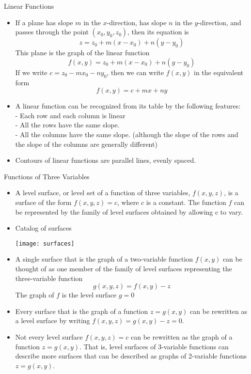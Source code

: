 \documentclass[12pt,letterpaper, onecolumn]{exam}
\begin{document}
		 Linear Functions
		\begin{itemize}
			\item If a plane has slope $m$ in the $x$-direction, has slope $n$ in the $y$-direction, and passes through the point $(x_0,y_0,z_0)$, then its equation is
			$$z=z_0+m(x-x_0)+n(y-y_0)$$
			This plane is the graph of the linear function
			$$f(x,y)=z_0+m(x-x_0)+n(y-y_0)$$
			If we write $c=z_0-mx_0-ny_0$, then we can write $f(x,y)$ in the equivalent form
			$$f(x,y)=c+mx+ny$$
			\item A linear function can be recognized from its table by the following features:\\
			- Each row and each column is linear\\
			- All the rows have the same slope.\\
			- All the columns have the same slope. (although the slope of the rows and the slope of the columns are generally different)
			\item Contours of linear functions are parallel lines, evenly spaced.
		\end{itemize}
		 Functions of Three Variables
		\begin{itemize}
			\item A level surface, or level set of a function of three variables, $f(x,y,z)$, is a surface of the form $f(x,y,z)=c$, where $c$ is a constant. The function $f$ can be represented by the family of level surfaces obtained by allowing c to vary.
			\item Catalog of surfaces\\
			\begin{minipage}[]{\textwidth}
			\centering
			\texttt{[image: surfaces]}
			\end{minipage}
			\item A single surface that is the graph of a two-variable function $f(x,y)$ can be thought of as one member of the family of level surfaces representing the three-variable function
			$$g(x,y,z)=f(x,y)-z$$
			The graph of $f$ is the level surface $g=0$
			\item Every surface that is the graph of a function $z=g(x,y)$ can be rewritten as a level surface by writing $f(x,y,z)=g(x,y)-z=0$.
			\item Not every level surface $f(x,y,z)=c$ can be rewritten as the graph of a function $z=g(x,y)$. That is, level surfaces of 3-variable functions can describe more surfaces that can be described as graphs of 2-variable functions $z=g(x,y)$.
		\end{itemize}
\end{document}
